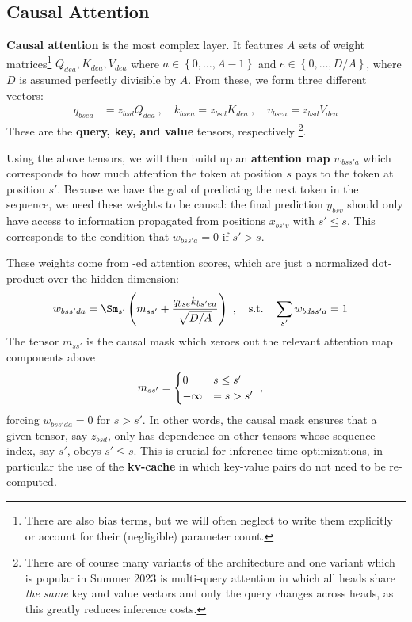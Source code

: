 \documentclass[11pt]{article}
\begin{document}
\subsection{Causal Attention \label{subsubsec_attn_layer} }

\textbf{Causal attention} is the most complex layer. It features $ A $  sets of weight
matrices\footnote{There are also bias terms, but we will often neglect to write them explicitly or
    account for their (negligible)
	parameter count.}  $ Q  _{ d e a}, K  _{ de a}, V  _{ dea }  $
where $ a \in \left \{ 0, \ldots, A-1 \right \} $ and $ e \in \left \{ 0, \ldots, D/A \right \} $,
where $ D $ is assumed perfectly divisible by $ A $.
From these, we form three different vectors:
\begin{align}
	q _{ bsea } & = z _{ bsd } Q _{ dea } \ , \quad
	k _{ bsea } = z _{ bsd } K _{ dea }  \ , \quad
	v _{ bsea } = z _{ bsd } V _{ dea }
\end{align}
These are the \textbf{query, key, and value} tensors, respectively \footnote{There are of course
	many variants of the architecture and one variant which is popular in Summer 2023 is multi-query
	attention \cite{shazeer2019fast} in which all heads share \textit{the same} key and value vectors
	and only the query changes across heads, as this greatly reduces inference costs.}.

Using the above tensors, we will then build up an \textbf{attention map}  $ w _{ bss'a } $
which corresponds to how much attention the token at position $ s $ pays to the token at
position $ s' $.  Because we have the goal of predicting the
next token in the sequence, we need these weights to be causal: the final prediction $ y _{ bsv } $
should only have access to information propagated from positions $ x _{ bs'v } $ with $ s' \le s $.
This corresponds to the condition that $ w _{ bss'a} = 0  $ if  $ s' > s  $.

These weights come from -ed attention scores, which are just a normalized
dot-product over the hidden dimension:
\begin{align}
    w _{ bss'da } & =\Sm _{ s' } \left (m _{ s s' }+\frac{q _{ bse }k _{ bs'ea } }{ \sqrt{D/A}}  \right
	)\ ,  \quad {\rm s.t.} \quad \sum_{s'}w _{ bdss'a } =1
\end{align}
The tensor $ m _{  s s' } $ is the causal mask which zeroes out the relevant attention map
components above
\begin{align}
	m _{ s s' } & = \begin{cases}
		                0       & s \le s' \nonumber\\
		                -\infty & = s > s'
	                \end{cases}\ ,
\end{align}
forcing $ w  _{ bss'da } =0$ for $ s> s' $. In other words, the causal mask ensures that a
given tensor, say $ z _{ bsd } $, only has dependence on other tensors whose sequence index, say $
	s' $, obeys $ s' \le s $.  This is crucial for inference-time optimizations, in particular the use
of the \textbf{kv-cache} in which key-value pairs do not need to be re-computed.
\end{document}
